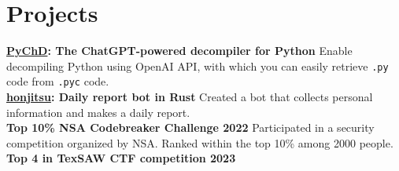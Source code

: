 \documentclass[10pt]{article}
\begin{document}
\section*{ Projects}
  \begin{multicols}{2}
    \noindent
    \textbf{
      \href{https://github.com/diohabara/pychd}{}
      \href{https://pypi.org/project/pychd/}{}
      \underline{PyChD}: The ChatGPT-powered decompiler for Python
    }
        Enable decompiling Python using OpenAI API, with which you can easily retrieve \verb|.py| code from \verb|.pyc| code.
    \\
    \noindent
    \textbf{
      \href{https://github.com/diohabara/honjitsu}{}
      \underline{honjitsu}: Daily report bot in Rust
    }
        Created a bot that collects personal information and makes a daily report.
    \\
    \noindent
    \textbf{
      \href{https://github.com/diohabara/nsa-codebreaker-challenge2022}{}
      Top 10\% NSA Codebreaker Challenge 2022
    }
        Participated in a security competition organized by NSA. Ranked within the top 10\% among 2000 people.
    \\
    \noindent
    \textbf{
      \href{https://ctftime.org/event/1959}{}
      Top 4 in TexSAW CTF competition 2023
}
\end{multicols}
\end{document}
